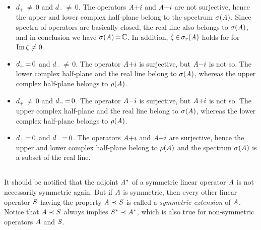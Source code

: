 \documentclass[11pt,twoside]{article}
\begin{document}
\begin{itemize}[leftmargin=14pt]
\item[1.]
$d_+ \,{\neq}\, 0$ and $d_- \,{\neq}\, 0$.
The operators $\mathit{A} {+} i$ and $\mathit{A} {-} i$ are not surjective,
hence the upper and lower complex half-plane
belong to the spectrum $\sigma(\mathit{A})$.
Since spectra of operators are basically closed,
the real line also belongs to $\sigma(\mathit{A})$,
and in conclusion we have $\sigma(\mathit{A}) {\,=\,} {\mathbb{C}}$.
In addition,
$\zeta {\,\in\,} \sigma_r(\mathit{A})$ holds for for $\operatorname{Im} \zeta \neq 0$.

\item[2.]
$d_+ {\,=\,} 0$ and $d_- \,{\neq}\, 0$.
The operator $\mathit{A} {+} i$ is surjective,
but $\mathit{A} {-} i$ is not so.
The lower complex half-plane and the real line belong to $\sigma(\mathit{A})$,
whereas the upper complex half-plane belongs to $\rho(\mathit{A})$.

\item[3.]
$d_+ \,{\neq}\, 0$ and $d_- {\,=\,} 0$.
The operator $\mathit{A} {-} i$ is surjective,
but $\mathit{A} {+} i$ is not so.
The upper complex half-plane and the real line belong to $\sigma(\mathit{A})$,
whereas the lower complex half-plane belongs to $\rho(\mathit{A})$.

\item[4.]
$d_+ {\,=\,} 0$ and $d_- {\,=\,} 0$.
The operators $\mathit{A} {+} i$ and $\mathit{A} {-} i$ are surjective,
hence the upper and lower complex half-plane belong to $\rho(\mathit{A})$
and the spectrum $\sigma(\mathit{A})$ is a subset of the real line.
\end{itemize}

\subsection{} %
It should be notified that the adjoint $\mathit{A}^*$ of a symmetric linear operator
$\mathit{A}$ is not necessarily symmetric again.
But if $\mathit{A}$ is symmetric,
then every other linear operator ${S}$ having the property
$\mathit{A} \prec {S}$ is called a \textit{symmetric extension} of $\mathit{A}$.
Notice 
that $\mathit{A} \prec {S}$ always implies ${S}^* \prec \mathit{A}^*$,
which is also true for non-symmetric operators $\mathit{A}$ and ${S}$.
\end{document}
